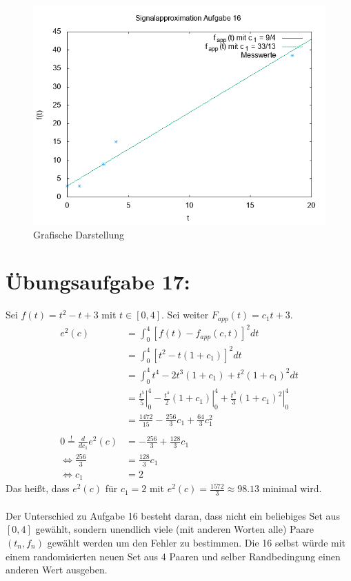     \begin{figure}
        \includegraphics[width=\textwidth]{A16_plot.png}
        \caption{Grafische Darstellung}
    \end{figure}
\newpage
	\section*{Übungsaufgabe 17:}
		Sei $f(t) = t^2-t +3$ mit $t\in[0,4]$. Sei weiter $F_{app}(t) = c_1t+3$.
		\begin{align*}
			e^2(c)	&= \int_0^4 \left[ f(t)-f_{app}(c,t) \right]^2 dt\\
					&= \int_0^4 \left[ t^2 -t(1+c_1) \right]^2 dt\\
					&= \int_0^4 t^4 -2t^3(1+c_1) + t^2(1+c_1)^2 dt\\
					&= \left.\frac{t^5}{5}\right|_0^4 - \left.\frac{t^4}{2}(1+c_1)\right|_0^4 + \left.\frac{t^3}{3}(1+c_1)^2 \right|_0^4\\
					&= \frac{1472}{15} - \frac{256}{3}c_1 + \frac{64}{3}c_1^2\\
					&\\
			0\overset{!}{=} \frac{d}{dc_1} e^2(c)	&= -\frac{256}{3} + \frac{128}{3}c_1\\
					\Leftrightarrow	\frac{256}{3}	&= \frac{128}{3}c_1\\
					\Leftrightarrow				c_1	&= 2
		\end{align*}
		Das heißt, dass $e^2(c)$ für $c_1 = 2$ mit $e^2(c) = \frac{1572}{3}\approx 98.13$ minimal wird.\\
		\\
		Der Unterschied zu Aufgabe 16 besteht daran, dass nicht ein beliebiges Set aus $[0,4]$ gewählt, sondern unendlich viele (mit anderen Worten alle) Paare $(t_n, f_n)$ gewählt werden um den Fehler zu bestimmen. Die 16 selbst würde mit einem randomisierten neuen Set aus 4 Paaren und selber Randbedingung einen anderen Wert ausgeben.
		
